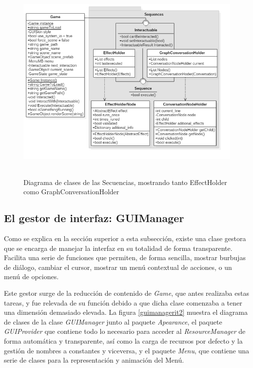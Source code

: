 \begin{figure}[h!]
	\centerline{\includegraphics[height=4in]{figures/it2/Sequences.png}}
	\caption[Sequences - Versión Final]{Diagrama de clases de las Secuencias, mostrando tanto EffectHolder como GraphConversationHolder}
	\label{sequencesfigit2}
\end{figure}

\subsection{El gestor de interfaz: GUIManager}

Como se explica en la sección superior a esta subsección, existe una clase gestora que se encarga de manejar la interfaz en su totalidad de forma transparente. Facilita una serie de funciones que permiten, de forma sencilla, mostrar burbujas de diálogo, cambiar el cursor, mostrar un menú contextual de acciones, o un menú de opciones.

Este gestor surge de la reducción de contenido de \textit{Game}, que antes realizaba estas tareas, y fue relevada de su función debido a que dicha clase comenzaba a tener una dimensión demasiado elevada. La figura \ref{guimanagerit2} muestra el diagrama de clases de la clase \textit{GUIManager} junto al paquete \textit{Apearance}, el paquete \textit{GUIProvider} que contiene todo lo necesario para acceder al \textit{ResourceManager} de forma automática y transparente, así como la carga de recursos por defecto y la gestión de nombres a constantes y viceversa, y el paquete \textit{Menu}, que contiene una serie de clases para la representación y animación del Menú.

